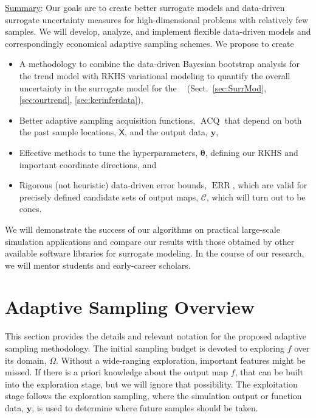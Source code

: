 \documentclass[11pt]{NSFamsart}
\newcommand{\Upara}[1]{\noindent\underline{\upshape #1}:}
\DeclareMathOperator{\QOI}{QOI} %
\DeclareMathOperator{\APP}{\widehat{\QOI}}
\DeclareMathOperator{\ERR}{ERR}
\DeclareMathOperator{\VAL}{ACQ}
\newcommand{\mX}{\mathsf{X}}
\newcommand{\by}{{\boldsymbol{y}}}
\newcommand{\btheta}{{\boldsymbol{\theta}}}
\newcommand{\calc}{{\mathcal{C}}}
\begin{document}
\Upara{Summary} 
Our goals are to create better surrogate models and data-driven surrogate uncertainty measures for high-dimensional problems with relatively few samples. We will develop, analyze, and implement flexible data-driven models and correspondingly economical adaptive sampling schemes. We propose to create
\begin{itemize}
\item A methodology to combine the data-driven Bayesian bootstrap analysis for the trend model with RKHS variational modeling to quantify the overall uncertainty in the surrogate model for the $\APP$ (Sect.\ \ref{sec:SurrMod}, \ref{sec:ourtrend},  \ref{sec:kerinferdata}),
\item Better adaptive sampling acquisition functions, $\VAL$ that depend on both the past sample locations, $\mX$, and the output data, $\by$, 
\item Effective methods to tune the hyperparameters, $\btheta$, defining our RKHS and important coordinate directions, and
\item Rigorous (not heuristic) data-driven error bounds, $\ERR$, which are valid for precisely defined candidate sets of output maps, $\calc$, which will turn out to be cones.
\end{itemize}
We will demonstrate the success of our algorithms on practical large-scale simulation applications and compare our results with those obtained by other available software libraries for surrogate modeling. In the course of our research, we will mentor students and early-career scholars. 

\section{Adaptive Sampling Overview} \label{sec:overview}
This section provides the details and relevant notation for the proposed adaptive sampling methodology. The initial sampling budget is devoted to exploring $f$ over its domain, $\Omega$. Without a wide-ranging exploration, important features might be missed. If there is a priori knowledge about the output map $f$, that can be built into the exploration stage, but we will ignore that possibility. The exploitation stage follows the exploration sampling, where the simulation output or function data, $\by$, is used to determine where future samples should be taken.
\end{document}
